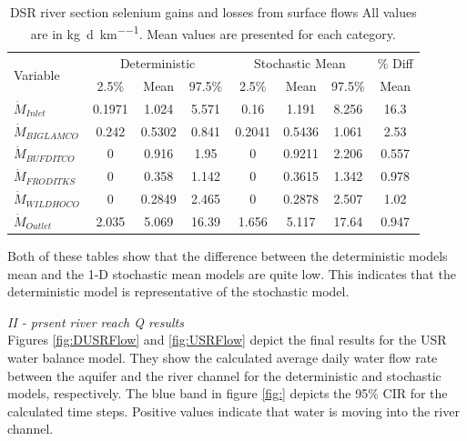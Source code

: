 \begin{linenumbers}
\begin{table}[htbp]
\centering
\caption[DSR river section selenium gains and losses from surface flows.]{DSR river section selenium gains and losses from surface flows  All values are in \si{\kilo\gram\per\day\per\kilo\meter}.  Mean values are presented for each category.}
\label{tab:DSRGaugeSeFlow}
	\begin{tabular}{l|ccc|ccc|c}
	\toprule
    \multirow{2}[0]{*}{Variable} & \multicolumn{3}{c}{Deterministic} & \multicolumn{3}{c}{Stochastic Mean} & \% Diff\\\cline{2-4} \cline{5-7}
    & 2.5\% & Mean & 97.5\% & 2.5\% & Mean & 97.5\% & Mean\\
    \midrule
    \midrule
	$\dot{M}_{Inlet}$&	0.1971	&1.024	&5.571	&0.16	&1.191	&8.256	&16.3	\\
	$\dot{M}_{BIGLAMCO}$&	0.242	&0.5302	&0.841	&0.2041	&0.5436	&1.061	&2.53	\\
	$\dot{M}_{BUFDITCO}$&	0	&0.916	&1.95	&0	&0.9211	&2.206	&0.557	\\
	$\dot{M}_{FRODITKS}$&	0	&0.358	&1.142	&0	&0.3615	&1.342	&0.978	\\
	$\dot{M}_{WILDHOCO}$&	0	&0.2849	&2.465	&0	&0.2878	&2.507	&1.02	\\
	$\dot{M}_{Outlet}$&	2.035	&5.069	&16.39	&1.656	&5.117	&17.64	&0.947	\\
	\bottomrule
	\end{tabular}
\end{table}

Both of these tables show that the difference between the deterministic models mean and the 1-D stochastic mean models are quite low.  This indicates that the deterministic model is representative of the stochastic model. 

\emph{II - prsent river reach Q results}\\

Figures \ref{fig:DUSRFlow} and \ref{fig:USRFlow} depict the final results for the USR water balance model.  They show the calculated average daily water flow rate between the aquifer and the river channel for the deterministic and stochastic models, respectively.  The blue band in figure \ref{fig:} depicts the 95\% CIR for the calculated time steps.  Positive values indicate that water is moving into the river channel.


\end{linenumbers}
